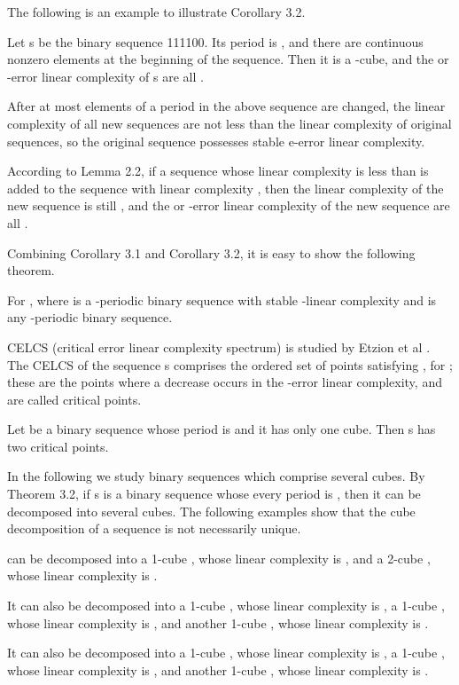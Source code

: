\documentclass[10pt,conference,twocolumn]{IEEEtran}
\begin{document}
The following is an example to illustrate Corollary 3.2.

Let s be the binary sequence 111100. Its period is
, and there are  continuous nonzero elements at the
beginning of the sequence. Then it is a -cube, and the
 or -error linear complexity of s are
all .

After at most  elements of a period in the above
sequence are changed, the linear complexity of all new sequences are
not less than the linear complexity of original sequences, so the
original sequence possesses stable e-error linear complexity.

According to Lemma 2.2, if a sequence whose linear complexity is
less than  is added to the sequence with linear
complexity , then the linear complexity of the new
sequence is still , and the  or
-error linear complexity of the new sequence are all
.

Combining Corollary   3.1 and Corollary   3.2, it is easy to show
the following theorem.


 For ,
 where  is a -periodic  binary sequence
with stable -linear complexity  and  is any
-periodic  binary sequence.



CELCS (critical error linear complexity spectrum) is studied  by
Etzion et al \cite{Etzion}. The CELCS of the sequence s comprises
the ordered set of points  satisfying , for ; these are the points where a decrease occurs
in the -error linear complexity, and are called critical points.

Let  be a binary sequence whose period is  and it has only
one cube. Then s has two critical points.

In the following we study binary sequences which comprise several
cubes. By Theorem 3.2, if s is a binary sequence whose every period
is , then it can be decomposed into several cubes. The
following examples show that the cube decomposition of a sequence is
not necessarily unique.

  can be decomposed into a 1-cube , whose linear complexity is ,
  and a 2-cube  , whose linear complexity is .

It can also be decomposed into a 1-cube , whose linear
complexity is , a 1-cube , whose linear complexity is
, and another 1-cube , whose linear complexity is
.

It can also be decomposed into a 1-cube , whose linear
complexity is , a 1-cube , whose linear complexity is
, and another 1-cube , whose linear complexity is
.
\end{document}
